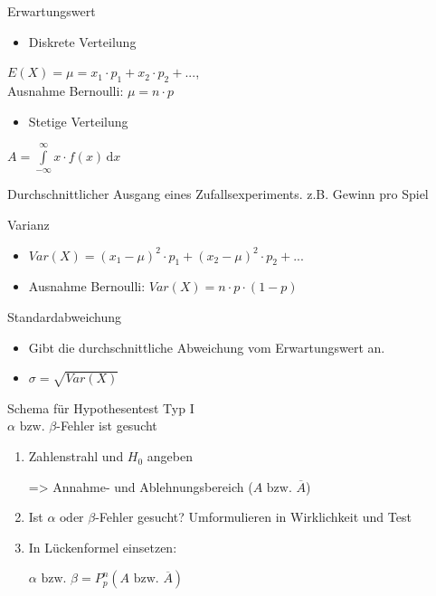 \documentclass[paper=a6,landscape,ngerman,twoside=true,fontsize=12pt]{scrartcl}
\begin{document}
\begin{frage}
	Erwartungswert
\end{frage}
\begin{antwort}
	\begin{itemize}
		\item Diskrete Verteilung
	\end{itemize}
	$E(X)=\mu=x_1 \cdot p_1 + x_2 \cdot p_2 + ...$,\\
	Ausnahme Bernoulli: $\mu=n \cdot p$
	\begin{itemize}
		\item Stetige Verteilung
	\end{itemize}
	$A=\displaystyle\int\limits_{-\infty}^{\infty} \!x\cdot f(x) \, \mathrm{d}x$
	
	Durchschnittlicher Ausgang eines Zufallsexperiments.
	z.B. Gewinn pro Spiel
\end{antwort}	
\begin{frage}
	Varianz
	
\end{frage}
\begin{antwort}
	\begin{itemize}
		\item $Var(X)=(x_1-\mu)^2 \cdot p_1+(x_2-\mu)^2 \cdot p_2+...$	
		\item Ausnahme Bernoulli: $Var(X)=n \cdot p \cdot (1-p)$	
	\end{itemize}	
\end{antwort}	
\begin{frage}
	Standardabweichung
	
\end{frage}
\begin{antwort}
	\begin{itemize}
		\item Gibt die durchschnittliche Abweichung vom Erwartungswert an.		
		\item $\sigma=\sqrt{Var(X)}$	
	\end{itemize}	
\end{antwort}	
\begin{frage}
	Schema für Hypothesentest Typ I\\
	$\alpha \text{ bzw. }\beta$-Fehler ist gesucht
	
\end{frage}
\begin{antwort}
	\begin{enumerate}
		\item Zahlenstrahl und $H_0$ angeben
		
		=> Annahme- und Ablehnungsbereich  ($A \text{ bzw. }\overline{A}$)	
		\item Ist  $\alpha \text{ oder }\beta$-Fehler gesucht? Umformulieren in Wirklichkeit und Test
		\item In Lückenformel einsetzen: 
		
		$\alpha \text{ bzw. }\beta=P^n_p(A\text{ bzw. }\overline{A})$	
	\end{enumerate}
	
\end{antwort}	
\end{document}
